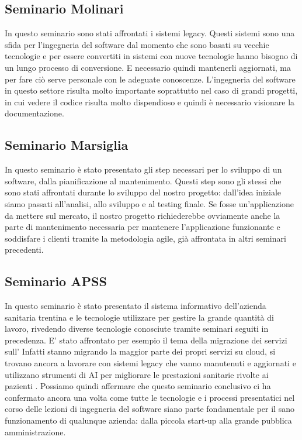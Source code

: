 \documentclass[a4paper,12pt]{article}
\begin{document}
\subsection{Seminario Molinari}
In questo seminario sono stati affrontati i sistemi legacy.
Questi sistemi sono una sfida per l'ingegneria del software dal momento che sono basati su vecchie tecnologie e per essere convertiti in sistemi con nuove tecnologie hanno bisogno di un lungo processo di conversione.
E necessario quindi mantenerli aggiornati, ma per fare ciò serve personale con le adeguate conoscenze.
L'ingegneria del software in questo settore risulta molto importante soprattutto nel caso di grandi progetti, in cui vedere il codice risulta molto dispendioso e quindi è necessario visionare la documentazione.

\subsection{Seminario Marsiglia}
In questo seminario è stato presentato gli step necessari per lo sviluppo di un software, dalla pianificazione al mantenimento.
Questi step sono gli stessi che sono stati affrontati durante lo sviluppo del nostro progetto: dall'idea iniziale siamo passati all'analisi, allo sviluppo e al testing finale.
Se fosse un'applicazione da mettere sul mercato, il nostro progetto richiederebbe ovviamente anche la parte di mantenimento necessaria per mantenere l'applicazione funzionante e soddisfare i clienti tramite la metodologia agile, già affrontata in altri seminari precedenti.

\subsection{Seminario APSS}
In questo seminario è stato presentato il sistema informativo dell'azienda sanitaria trentina e le tecnologie utilizzare per gestire la grande quantità di lavoro, rivedendo diverse tecnologie conosciute tramite seminari seguiti in precedenza.
E' stato affrontato per esempio il tema della migrazione dei servizi sull' 
Infatti stanno migrando la maggior parte dei propri servizi su cloud, si trovano ancora a lavorare con sistemi legacy che vanno manutenuti e aggiornati e utilizzano strumenti di AI per migliorare le prestazioni sanitarie rivolte ai pazienti .
Possiamo quindi affermare che questo seminario conclusivo ci ha confermato ancora una volta come tutte le tecnologie e i processi presentatici nel corso delle lezioni di ingegneria del software siano parte fondamentale per il sano funzionamento di qualunque azienda: dalla piccola start-up alla grande pubblica amministrazione.
\end{document}

